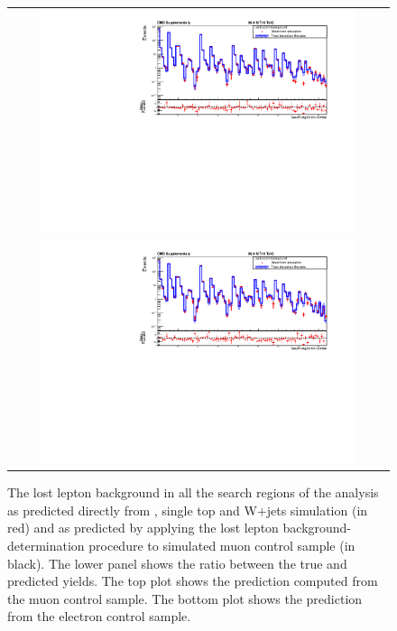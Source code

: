 \begin{figure}[htbp]
\begin{center}
\begin{tabular}{c}
\includegraphics[width=0.85\textwidth, height=0.35\textheight]{sections/mc4/Backgrounds/LostLepton/figures/v3_closure_mu_cs.pdf}\\
\includegraphics[width=0.85\textwidth, height=0.35\textheight]{sections/mc4/Backgrounds/LostLepton/figures/v3_closure_el_cs.pdf}
\end{tabular}
\end{center}
\caption{The lost lepton background in all the search regions of the analysis as predicted directly from \ttbar, single top and W$+$jets simulation (in red) and as predicted by applying the lost lepton background-determination procedure to simulated muon control sample (in black). The lower panel shows the ratio between the true and predicted yields. The top plot shows the prediction computed from the muon control sample. The bottom plot shows the prediction from the electron control sample.}
\label{fig:closureSBisotrk}
\end{figure}

